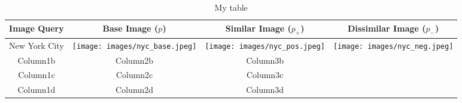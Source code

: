 \begin{table}
	\begin{tabular}{*{4}{c}}
		\toprule
		\bfseries Image Query & \bfseries Base Image ($p$) & \bfseries Similar Image ($p_+$) & \bfseries Dissimilar Image ($p_-$) \\
		\midrule
		\centering New York City & \texttt{[image: images/nyc\_base.jpeg]} & \texttt{[image: images/nyc\_pos.jpeg]} & \texttt{[image: images/nyc\_neg.jpeg]}\\
		Column1b & Column2b & Column3b & \\
		Column1c & Column2c & Column3c & \\
		Column1d & Column2d & Column3d & \\
		\bottomrule
	\end{tabular}
	\caption{My table}
	\label{table:random_triplets}
\end{table}

















